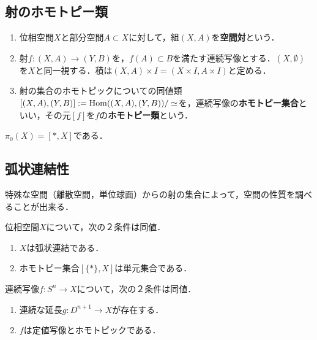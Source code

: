\documentclass[uplatex,dvipdfmx]{jsreport}
\begin{document}
\subsection{射のホモトピー類}

\begin{definition}\mbox{}
    \begin{enumerate}
        \item 位相空間$X$と部分空間$A\subset X$に対して，組$(X,A)$を\textbf{空間対}という．
        \item 射$f:(X,A)\to(Y,B)$を，$f(A)\subset B$を満たす連続写像とする．$(X,\emptyset)$を$X$と同一視する．積は$(X,A)\times I=(X\times I,A\times I)$と定める．
        \item 射の集合のホモトピックについての同値類$[(X,A),(Y,B)]:=\mathrm{Hom}((X,A),(Y,B))/\simeq$を，連続写像の\textbf{ホモトピー集合}といい，その元$[f]$を$f$の\textbf{ホモトピー類}という．
    \end{enumerate}
\end{definition}

\begin{example}
    $\pi_0(X)=[*,X]$である．
\end{example}

\subsection{弧状連結性}

\begin{tcolorbox}[colframe=ForestGreen, colback=ForestGreen!10!white,breakable,colbacktitle=ForestGreen!40!white,coltitle=black,fonttitle=\bfseries\sffamily,
title=]
    特殊な空間（離散空間，単位球面）からの射の集合によって，空間の性質を調べることが出来る．
\end{tcolorbox}

\begin{lemma}
    位相空間$X$について，次の２条件は同値．
    \begin{enumerate}
        \item $X$は弧状連結である．
        \item ホモトピー集合$[\{*\},X]$は単元集合である．
    \end{enumerate}
\end{lemma}

\begin{lemma}
    連続写像$f:S^n\to X$について，次の２条件は同値．
    \begin{enumerate}
        \item 連続な延長$g:D^{n+1}\to X$が存在する．
        \item $f$は定値写像とホモトピックである．
    \end{enumerate}
\end{lemma}
\end{document}
